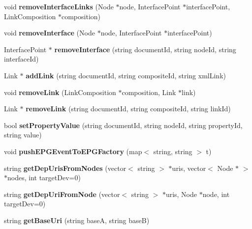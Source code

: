 \begin{CompactItemize}
\item 
void \textbf{removeInterfaceLinks} (Node $\ast$node, InterfacePoint $\ast$interfacePoint, LinkComposition $\ast$composition)\label{classbr_1_1pucrio_1_1telemidia_1_1ginga_1_1ncl_1_1FormatterMediator_76d0a97972503bcd8809af2078a12bd3}

\item 
void \textbf{removeInterface} (Node $\ast$node, InterfacePoint $\ast$interfacePoint)\label{classbr_1_1pucrio_1_1telemidia_1_1ginga_1_1ncl_1_1FormatterMediator_79eedbd370d48b15bdaab84b8b33c551}

\item 
InterfacePoint $\ast$ \textbf{removeInterface} (string documentId, string nodeId, string interfaceId)\label{classbr_1_1pucrio_1_1telemidia_1_1ginga_1_1ncl_1_1FormatterMediator_36124c5efea2c25f900cc96cac5ef83a}

\item 
Link $\ast$ \textbf{addLink} (string documentId, string compositeId, string xmlLink)\label{classbr_1_1pucrio_1_1telemidia_1_1ginga_1_1ncl_1_1FormatterMediator_a12a5aaa41a65dbf50538494f18a8de9}

\item 
void \textbf{removeLink} (LinkComposition $\ast$composition, Link $\ast$link)\label{classbr_1_1pucrio_1_1telemidia_1_1ginga_1_1ncl_1_1FormatterMediator_0544ce0b06dd7a4b89bdb16b692f521e}

\item 
Link $\ast$ \textbf{removeLink} (string documentId, string compositeId, string linkId)\label{classbr_1_1pucrio_1_1telemidia_1_1ginga_1_1ncl_1_1FormatterMediator_3987f88a732beac398d9647fb249a539}

\item 
bool \textbf{setPropertyValue} (string documentId, string nodeId, string propertyId, string value)\label{classbr_1_1pucrio_1_1telemidia_1_1ginga_1_1ncl_1_1FormatterMediator_97550d78c917de706089c863135d0c4d}

\item 
void \textbf{pushEPGEventToEPGFactory} (map$<$ string, string $>$ t)\label{classbr_1_1pucrio_1_1telemidia_1_1ginga_1_1ncl_1_1FormatterMediator_03f0f1e577dc80fc2e776c470579b17c}

\item 
string \textbf{getDepUrisFromNodes} (vector$<$ string $>$ $\ast$uris, vector$<$ Node $\ast$ $>$ $\ast$nodes, int targetDev=0)\label{classbr_1_1pucrio_1_1telemidia_1_1ginga_1_1ncl_1_1FormatterMediator_ad4f22815550601a963b012128abf88b}

\item 
string \textbf{getDepUriFromNode} (vector$<$ string $>$ $\ast$uris, Node $\ast$node, int targetDev=0)\label{classbr_1_1pucrio_1_1telemidia_1_1ginga_1_1ncl_1_1FormatterMediator_f36daf78c087f6bf94a77a6079fd26a9}

\item 
string \textbf{getBaseUri} (string baseA, string baseB)\label{classbr_1_1pucrio_1_1telemidia_1_1ginga_1_1ncl_1_1FormatterMediator_72e4482c24aa18c147ede519c6f60a8f}

\end{CompactItemize}
